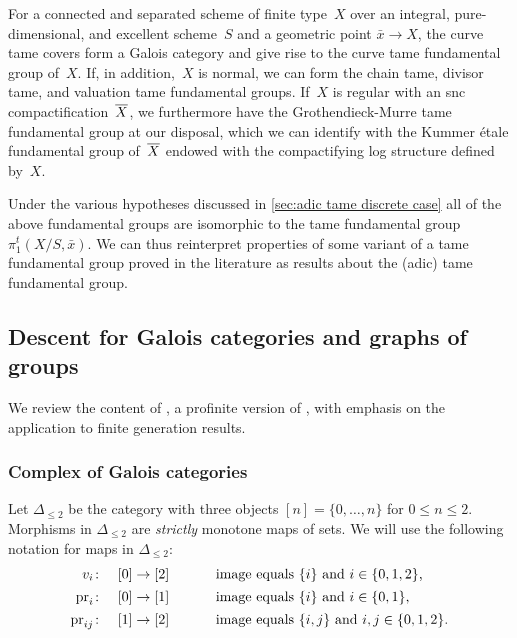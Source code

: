 \begin{rmk}
For a connected and separated scheme of finite type~$X$ over an integral, pure-dimensional, and excellent scheme~$S$ and a geometric point $\bar{x} \to X$, the curve tame covers form a Galois category and give rise to the curve tame fundamental group of~$X$.
If, in addition,~$X$ is normal, we can form the chain tame, divisor tame, and valuation tame fundamental groups.
If~$X$ is regular with an snc compactification~$\overline{X}$, we furthermore have the Grothendieck-Murre tame fundamental group at our disposal, which we can identify with the Kummer étale fundamental group of~$\overline{X}$ endowed with the compactifying log structure defined by~$X$. 

Under the various hypotheses discussed in \cref{sec:adic tame discrete case} all of the above fundamental groups are isomorphic to the tame fundamental group $\pi_1^t(X/S,\bar{x})$.
We can thus reinterpret properties of some variant of a tame fundamental group proved in the literature as results about the (adic) tame fundamental group.
\end{rmk}


\subsection{Descent for Galois categories and graphs of groups}
\label{sec:descent for Gal cats}

We review the content of \cite{Stix2006:vanKampen}, a profinite version of \cite{HaefligerComplexesGroups}, with emphasis on the application to finite generation results. 

\subsubsection*{Complex of Galois categories}
Let $\Delta_{\leq 2}$ be the category with three objects $[n] = \{0,\ldots,n\}$ for $0 \leq n \leq 2$. Morphisms in $\Delta_{\leq 2}$ are \emph{strictly} monotone maps of sets. We will use the following notation for maps in $\Delta_{\leq 2}$:
\[
\begin{array}{rll}
    v_i \colon & [0] \to [2] & \qquad \text{ image equals $\{i\}$ and $i \in \{0,1,2\}$,} \\[1ex]
    \operatorname{pr}_{i} \colon & [0] \to [1] & \qquad \text{ image equals $\{i\}$ and $i \in \{0,1\}$,} \\[1ex] 
    \operatorname{pr}_{ij} \colon & [1] \to [2] & \qquad  \text{ image equals $\{i,j\}$ and $i,j \in \{0,1,2\}$.}
\end{array}
\]

